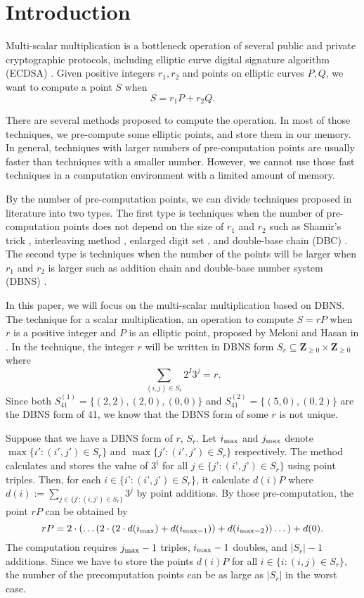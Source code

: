 \section{Introduction}

Multi-scalar multiplication is a bottleneck operation of several public and private cryptographic protocols, including elliptic curve digital signature algorithm (ECDSA) \cite{ECDSA}. Given positive integers $r_1, r_2$ and points on elliptic curves $P, Q$, we want to compute a point $S$ when 
$$S = r_1 P + r_2 Q.$$

There are several methods proposed to compute the operation. In most of those techniques, we pre-compute some elliptic points, and store them in our memory. In general, techniques with larger numbers of pre-computation points are usually faster than techniques with a smaller number. However, we cannot use those fast techniques in a computation environment with a limited amount of memory. 

By the number of pre-computation points, we can divide techniques proposed in literature into two types. The first type is techniques when the number of pre-computation points does not depend on the size of $r_1$ and $r_2$ such as Shamir’s trick \cite{Shamir}, interleaving method \cite{interleaving}, enlarged digit set \cite{enlarged2,enlarged4,enlarged1,enlarged3}, and double-base chain (DBC) \cite{dbc2,dbc3,dbc1}. The second type is techniques when the number of the points will be larger when $r_1$ and $r_2$ is larger such as addition chain \cite{additionChain1,additionChain2} and double-base number system (DBNS)  \cite{dbns}.

In this paper, we will focus on the multi-scalar multiplication based on DBNS. The technique for a scalar multiplication, an operation to compute $S = rP$ when $r$ is a positive integer and $P$ is an elliptic point, proposed by Meloni and Hasan in \cite{dbns}.  In the technique, the integer $r$ will be written in DBNS form $S_r \subseteq \mathbf{Z}_{\geq 0} \times \mathbf{Z}_{\geq 0}$ where
$$\sum_{(i,j) \in S_r} 2^I 3^j = r.$$ 
Since both $S^{(1)}_{41} = \{(2,2), (2,0), (0,0)\}$ and $S^{(2)}_{41} = \{(5,0), (0,2)\}$ are the DBNS form of 41, we know that the DBNS form of some $r$ is not unique.


Suppose that we have a DBNS form of $r$, $S_r$. Let $i_{\rm max}$ and $j_{\rm max}$ denote $\max\{ i' : (i',j') \in S_r \}$ and $\max\{ j' : (i',j') \in S_r \}$ respectively. The method calculates and stores the value of $3^i$ for all $j \in \{j’ : (i’, j’) \in S_r \}$ using point triples. Then, for each $i \in \{i’ : (i’, j’) \in S_r \}$, it calculate $d(i)P$ where $d(i) := \sum\limits_{j \in \{j’ : (i,j’) \in S_r\}} 3^j $ by point additions. By those pre-computation, the point $rP$ can be obtained by
$$rP = 2\cdot \left( \dots \left( 2 \cdot \left( 2 \cdot d(i_{\rm max}) + d(i_{\mathrm{max} - 1}) \right) + d(i_{\mathrm{max} - 2}) \right) \dots \right) + d(0).$$
The computation requires $j_{\rm max} - 1$ triples, $i_{\rm max} - 1$ doubles, and $|S_r| - 1$ additions. Since we have to store the points $d(i)P$ for all $i \in \{i : (i,j) \in S_r\}$, the number of the precomputation points can be as large as $|S_r|$ in the worst case.

